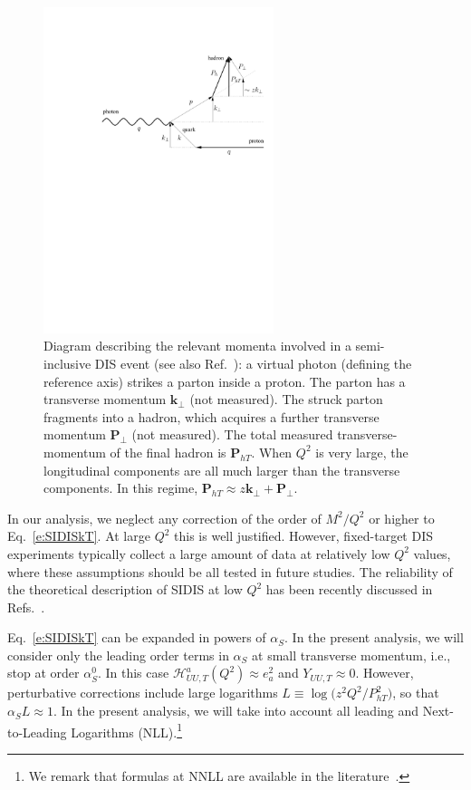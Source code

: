 \documentclass[aps,preprintnumbers,showpacs,nofootinbib,superscriptaddress,floatfix]{revtex4}
\newcommand{\AS}[1]{{\textcolor[rgb]{1,0,1}{#1}}}
\newcommand{\T}{\perp}
\newcommand{\Tperp}{T}
\begin{document}
\begin{figure}
\centering
\includegraphics[width=0.6\textwidth]{plots/trans_momenta_SIDIS}
\caption{Diagram describing the relevant momenta involved in a semi-inclusive DIS event (see also Ref.~\cite{Matevosyan:2011vj}): a
  virtual photon (defining the reference axis) strikes a parton inside a
  proton. The parton has a transverse momentum $\bm{k}_\perp$ (not measured). The
  struck parton fragments into a hadron, which acquires a further transverse
  momentum $\bm{P}_\perp$ (not measured). 
 The total measured transverse-momentum of the
  final hadron is $\bm{P}_{h\Tperp}$. When $Q^2$ is very large, the longitudinal
  components are all much larger than the transverse components. In this
  regime,  
  $\bm{P}_{h\Tperp} \approx z \bm{k}_\T + \bm{P}_\T$.} 
\label{f:trans_momenta_SIDIS}
\end{figure}

In our analysis, we neglect any correction of the order of $M^2/Q^2$ or higher
to  Eq.~\eqref{e:SIDISkT}.
At large $Q^2$ this is well justified. 
However, fixed-target DIS experiments typically 
collect a large amount of data
at relatively low $Q^2$ values, where these assumptions
should be all tested in future studies. The reliability
of the theoretical description of SIDIS at low $Q^2$ has been recently
discussed in Refs.~\cite{Boglione:2016bph,Moffat:2017sha}.
 
Eq.~\eqref{e:SIDISkT} can be expanded in powers
of $\alpha_S$. In the present analysis, we 
will consider only the leading order terms in $\alpha_S$ \AS{at small transverse momentum}, i.e., stop at
order $\alpha_S^0$. In this case 
$\mathcal{H}^a_{UU,T} (Q^2) \approx e_a^2$
and $Y_{UU,T}\approx 0$. 
However, perturbative corrections include large logarithms $L \equiv
\log\big(z^2 Q^2/P_{hT}^2\big)$, so that $\alpha_S L \approx 1$.
In the present analysis, we will take into account all
leading and Next-to-Leading Logarithms (NLL).\footnote{We
  remark that formulas at NNLL are available in the
  literature~\cite{Echevarria:2016scs}.}  
\end{document}
